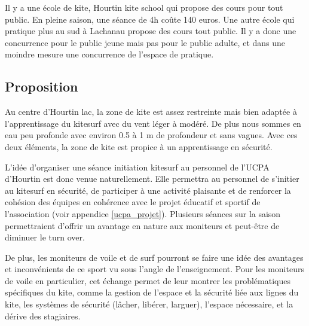 \documentclass[11pt,a4paper]{report}
\begin{document}
Il y a une école de kite, Hourtin kite school
qui propose des cours pour tout public. 
En pleine saison, une séance de 4h co\^ute 140 euros.
Une autre école qui pratique plus au sud à Lachanau propose
des cours tout public.
Il y a donc une concurrence pour le public jeune mais pas pour le public
adulte, et dans une moindre mesure une concurrence de l'espace de pratique.

\subsection{Proposition}


Au centre d'Hourtin lac, la zone de kite est assez restreinte 
mais bien adaptée à l'apprentissage
du kitesurf avec du vent léger à modéré. De plus nous sommes en 
eau peu profonde avec environ 0.5 à 1 m
de profondeur et sans vagues. Avec ces deux éléments, la zone de kite 
est propice à un apprentissage en sécurité.


L'idée d'organiser une séance initiation kitesurf
au personnel de l'UCPA d'Hourtin est donc venue naturellement.
Elle permettra au personnel de s'initier au kitesurf en 
sécurité, de participer à une activité plaisante
et de renforcer la cohésion des équipes en cohérence avec le 
projet éducatif et sportif de l'association (voir appendice \ref{ucpa_projet}). 
Plusieurs séances sur la saison permettraient
d'offrir un avantage en nature aux moniteurs et peut-\^etre 
de diminuer le turn over. 

De plus, les moniteurs de voile et de surf pourront se faire une idée des
avantages et inconvénients de ce sport vu sous l'angle de l'enseignement.
Pour les moniteurs de voile en particulier, cet échange permet
de leur montrer les problématiques spécifiques du kite, 
comme la gestion de l'espace et la sécurité liée aux lignes du kite, 
les  systèmes de sécurité 
(lâcher, libérer, larguer), l'espace nécessaire, et la dérive
des stagiaires.
\end{document}
